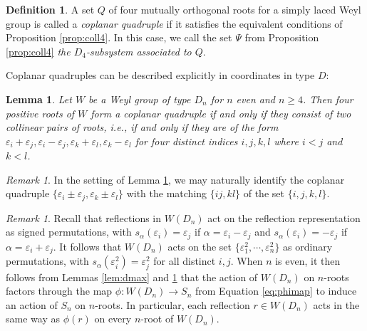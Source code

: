\documentclass[11pt]{amsart}
\theoremstyle{plain}
\newtheorem{lemma}[theorem]{Lemma}
\theoremstyle{definition}
\newtheorem{defn}[theorem]{Definition}
\theoremstyle{remark}
\newtheorem{rmk}[theorem]{Remark}
\numberwithin{equation}{subsection}
\newcommand{\al}{\alpha}
\newcommand{\ep}{\varepsilon}
\newcommand{\ra}{\rightarrow}
\newcommand{\coplanar}{coplanar\xspace}
\begin{document}
\begin{defn}\label{def:coll4}
A set $Q$ of four mutually orthogonal roots for a simply laced Weyl group is
called a {\it \coplanar quadruple} if it satisfies the equivalent conditions of
Proposition \ref{prop:coll4}. In this case, we call the set $\Psi$ from
Proposition \ref{prop:coll4} \emph{the $D_4$-subsystem associated to $Q$}.
\end{defn}

Coplanar quadruples can be described explicitly in coordinates in type $D$:
\begin{lemma}
    \label{lem:d4coplanar} Let $W$ be a Weyl group of type $D_n$ for $n$ even
      and $n\ge 4$. Then four positive roots of $W$ form a coplanar quadruple if
      and only if they consist of two collinear pairs of roots, i.e., if and
      only if they are of the form $\ep_i+\ep_j, \ep_i-\ep_j,
      \ep_k+\ep_l,\ep_k-\ep_l$ for four distinct indices $i,j,k,l$ where $i<j$
      and $k<l$.
  \end{lemma}

\begin{rmk}
\label{rmk:d4matching}
In the setting of Lemma \ref{lem:d4coplanar}, we may naturally identify the
coplanar quadruple $\{\ep_i\pm\ep_j,\ep_k\pm\ep_l\}$ with the matching
$\{ij,kl\}$ of the set $\{i,j,k,l\}$.
\end{rmk}


\begin{rmk}
\label{rmk:Daction}
Recall that reflections in $W(D_n)$ act on the reflection representation as
signed permutations, with $s_{\al}(\ep_i)=\ep_j$ if $\al=\ep_i-\ep_j$ and
$s_\al(\ep_i)=-\ep_j$ if $\al=\ep_i+\ep_j$.  It follows that $W(D_n)$ acts on
the set $\{\ep_1^2,\cdots,\ep_n^2\}$ as ordinary permutations, with
$s_\al(\ep_i^2)=\ep_j^2$ for all distinct $i, j$.  When $n$ is even, it then
follows from Lemmas \ref{lem:dmax} and \ref{lem:d4coplanar} that the action of
$W(D_n)$ on $n$-roots factors through the map $\phi:W(D_n)\ra S_n$ from Equation
\eqref{eq:phimap} to induce an action of $S_n$ on $n$-roots. In particular, each
reflection $r\in W(D_n)$ acts in the same way as $\phi(r)$ on every $n$-root of
$W(D_n)$.
\end{rmk}
\end{document}
